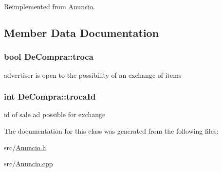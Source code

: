 Reimplemented from \hyperlink{class_anuncio_a22ca83f9eb721f4dc20dcbe952d29166}{Anuncio}.



\subsection{Member Data Documentation}
\hypertarget{class_de_compra_a708ee7e2f74c736428d5c9c7308ee300}{}
\subsubsection[{troca}]{\setlength{\rightskip}{0pt plus 5cm}bool De\+Compra\+::troca\hspace{0.3cm}{\ttfamily [protected]}}\label{class_de_compra_a708ee7e2f74c736428d5c9c7308ee300}
advertiser is open to the possibility of an exchange of items \hypertarget{class_de_compra_a280cfa44a43c68e29b446bef1a10e9d7}{}
\subsubsection[{troca\+Id}]{\setlength{\rightskip}{0pt plus 5cm}int De\+Compra\+::troca\+Id\hspace{0.3cm}{\ttfamily [protected]}}\label{class_de_compra_a280cfa44a43c68e29b446bef1a10e9d7}
id of sale ad possible for exchange 

The documentation for this class was generated from the following files\+:\begin{DoxyCompactItemize}
\item 
src/\hyperlink{_anuncio_8h}{Anuncio.\+h}\item 
src/\hyperlink{_anuncio_8cpp}{Anuncio.\+cpp}\end{DoxyCompactItemize}
